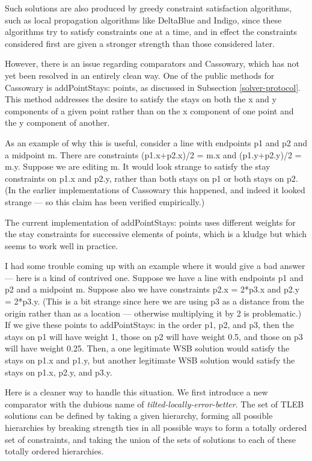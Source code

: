 \documentclass{article}
\begin{document}
Such solutions are also produced by greedy constraint satisfaction
algorithms, such as local propagation algorithms like DeltaBlue and Indigo,
since these algorithms try to satisfy constraints one at a time, and in
effect the constraints considered first are given a stronger strength than
those considered later.

However, there is an issue regarding comparators and Cassowary, which has
not yet been resolved in an entirely clean way.  One of the public methods
for Cassowary is {\sf addPointStays: points}, as discussed in Subsection
\ref{solver-protocol}.  This method addresses the desire to satisfy the
stays on both the {\sf x} and {\sf y} components of a given point rather
than on the {\sf x} component of one point and the {\sf y} component of
another.

As an example of why this is useful, consider a line with endpoints 
{\sf p1} and {\sf p2} and a midpoint {\sf m}.  There are constraints 
{\sf (p1.x+p2.x)/2 = m.x} and {\sf (p1.y+p2.y)/2 = m.y}.  Suppose we are
editing {\sf m}.  It would look strange to satisfy the stay constraints on
{\sf p1.x} and  {\sf p2.y}, rather than both stays on {\sf p1} or both
stays on {\sf p2}.  (In the earlier implementations of Cassowary this
happened, and indeed it looked strange --- so this claim has been verified
empirically.)

The current implementation of {\sf addPointStays: points} uses different
weights for the stay constraints for successive elements of {\sf points},
which is a kludge but which seems to work well in practice.

I had some trouble coming up with an example where it would give a bad
answer --- here is a kind of contrived one.  Suppose we have a line with
endpoints {\sf p1} and {\sf p2} and a midpoint {\sf m}.  Suppose also we
have constraints {\sf p2.x = 2*p3.x} and {\sf p2.y = 2*p3.y}.  (This is a
bit strange since here we are using {\sf p3} as a distance from the origin
rather than as a location --- otherwise multiplying it by 2 is
problematic.)  If we give these points to {\sf addPointStays:} in the order
{\sf p1}, {\sf p2}, and {\sf p3}, then the stays on {\sf p1} will have
weight 1, those on {\sf p2} will have weight 0.5, and those on {\sf p3}
will have weight 0.25.  Then, a one legitimate WSB solution would satisfy
the stays on {\sf p1.x} and {\sf p1.y}, but another legitimate WSB solution
would satisfy the stays on {\sf p1.x}, {\sf p2.y}, and {\sf p3.y}.

Here is a cleaner way to handle this situation.  We first introduce a new
comparator with the dubious name of {\em tilted-locally-error-better}.  The
set of TLEB solutions can be defined by taking a given hierarchy, forming
all possible hierarchies by breaking strength ties in all possible ways to
form a totally ordered set of constraints, and taking the union of the sets
of solutions to each of these totally ordered hierarchies.
\end{document}
